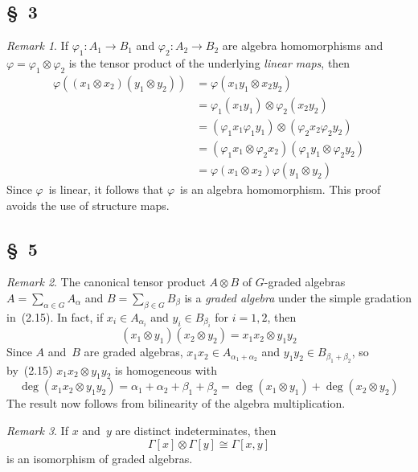 \documentclass[letterpaper,12pt]{article}
\newcommand{\iso}{\cong}
\newcommand{\tprod}{\otimes}
\theoremstyle{definition}
\theoremstyle{remark}
\newtheorem*{rmk}{Remark}
\begin{document}
\subsection*{\S~3}
\begin{rmk}
If \(\varphi_1:A_1\to B_1\) and \(\varphi_2:A_2\to B_2\) are algebra homomorphisms and \(\varphi=\varphi_1\tprod\varphi_2\) is the tensor product of the underlying \emph{linear maps}, then
\begin{align*}
\varphi((x_1\tprod x_2)(y_1\tprod y_2))&=\varphi(x_1y_1\tprod x_2y_2)\\
	&=\varphi_1(x_1y_1)\tprod\varphi_2(x_2y_2)\\
	&=(\varphi_1x_1\varphi_1y_1)\tprod(\varphi_2x_2\varphi_2y_2)\\
	&=(\varphi_1x_1\tprod\varphi_2 x_2)(\varphi_1y_1\tprod\varphi_2 y_2)\\
	&=\varphi(x_1\tprod x_2)\varphi(y_1\tprod y_2)
\end{align*}
Since \(\varphi\)~is linear, it follows that \(\varphi\)~is an algebra homomorphism. This proof avoids the use of structure maps.
\end{rmk}

\subsection*{\S~5}
\begin{rmk}
The canonical tensor product \(A\tprod B\) of \(G\)-graded algebras \(A=\sum_{\alpha\in G}A_{\alpha}\) and \(B=\sum_{\beta\in G}B_{\beta}\) is a \emph{graded algebra} under the simple gradation in~(2.15). In fact, if \(x_i\in A_{\alpha_i}\) and \(y_i\in B_{\beta_i}\) for \(i=1,2\), then
\[(x_1\tprod y_1)(x_2\tprod y_2)=x_1x_2\tprod y_1y_2\]
Since \(A\) and~\(B\) are graded algebras, \(x_1x_2\in A_{\alpha_1+\alpha_2}\) and \(y_1y_2\in B_{\beta_1+\beta_2}\), so by~(2.15) \(x_1x_2\tprod y_1y_2\) is homogeneous with
\[\deg(x_1x_2\tprod y_1y_2)=\alpha_1+\alpha_2+\beta_1+\beta_2=\deg(x_1\tprod y_1)+\deg(x_2\tprod y_2)\]
The result now follows from bilinearity of the algebra multiplication.
\end{rmk}

\begin{rmk}
If \(x\) and~\(y\) are distinct indeterminates, then
\[\Gamma[x]\tprod\Gamma[y]\iso\Gamma[x,y]\]
is an isomorphism of graded algebras.
\end{rmk}
\end{document}
